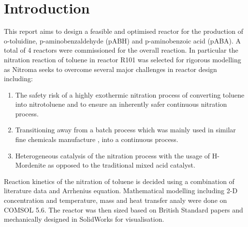 \section{Introduction}
This report aims to design a feasible and optimised reactor for the production of o-toluidine, p-aminobenzaldehyde (pABH) and p-aminobenzoic acid (pABA). A total of 4 reactors were commissioned for the overall reaction. 
In particular the nitration reaction of toluene in reactor R101 was selected for rigorous modelling as Nitroma seeks to overcome several major challenges in reactor design including:

\begin{enumerate}
    \item The safety risk of a highly exothermic nitration process of converting toluene into nitrotoluene and to ensure an inherently safer continuous nitration process. 
    \item Transitioning away from a batch process which was mainly used in similar fine chemicals manufacture \cite{di_miceli_raimondi_safety_2015}, into a continuous process. 
    \item Heterogeneous catalysis of the nitration process with the usage of H-Mordenite as opposed to the traditional mixed acid catalyst. 
\end{enumerate}

Reaction kinetics of the nitration of toluene is decided using a combination of literature data and Arrhenius equation. Mathematical modelling including 2-D concentration and temperature, mass and heat transfer analy were done on COMSOL 5.6. The reactor was then sized based on British Standard papers and mechanically designed in SolidWorks for visualisation.


